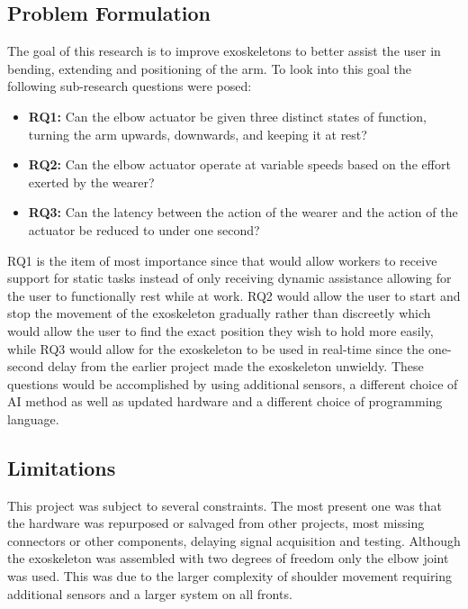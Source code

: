 \subsection{Problem Formulation}
The goal of this research is to improve exoskeletons to better assist the user in bending, extending and positioning of the arm.
To look into this goal the following sub-research questions were posed:
\begin{itemize}
        
    \item \textbf{RQ1:} Can the elbow actuator be given three distinct states of function, turning the arm upwards, downwards, and keeping it at rest?

    \item \textbf{RQ2:} Can the elbow actuator operate at variable speeds based on the effort exerted by the wearer?

    \item \textbf{RQ3:} Can the latency between the action of the wearer and the action of the actuator be reduced to under one second?

\end{itemize}
RQ1 is the item of most importance since that would allow workers to receive support for static tasks instead of only receiving dynamic
assistance allowing for the user to functionally rest while at work. RQ2 would allow the user to start and stop the
movement of the exoskeleton gradually rather than discreetly which would allow the user to find the exact position they
wish to hold more easily, while RQ3 would allow for the exoskeleton to be used in real-time since the one-second delay from the earlier project made the exoskeleton unwieldy. 
These questions would be accomplished by using additional sensors, a different choice of AI method as well as updated hardware and a different
choice of programming language.\newline


\subsection{Limitations}
This project was subject to several constraints. 
The most present one was that the hardware was repurposed or salvaged from other projects, most missing connectors or other components,
delaying signal acquisition and testing.
Although the exoskeleton was assembled with two degrees of freedom only the elbow joint was used.
This was due to the larger complexity of shoulder movement requiring additional sensors and a larger system on all
fronts.
